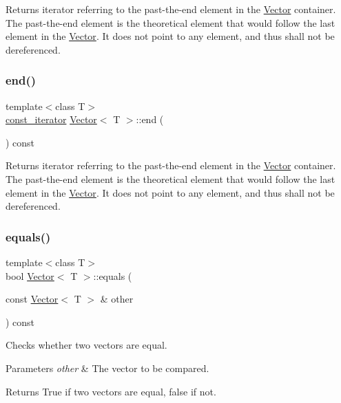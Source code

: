 Returns iterator referring to the {\ttfamily past-\/the-\/end} element in the \hyperlink{classVector}{Vector} container. The past-\/the-\/end element is the theoretical element that would follow the last element in the \hyperlink{classVector}{Vector}. It does not point to any element, and thus shall not be dereferenced. \mbox{\label{classVector_a3f5f39e8ec9f506664b259299e79c485}} 
\subsubsection{\texorpdfstring{end()}{end()}\hspace{0.1cm}{\footnotesize\ttfamily [4/4]}}
{\footnotesize\ttfamily template$<$class T$>$ \\
\hyperlink{classVector_a484e934cc06bb84c7d70042e792b6e55}{const\+\_\+iterator} \hyperlink{classVector}{Vector}$<$ T $>$\+::end (\begin{DoxyParamCaption}{ }\end{DoxyParamCaption}) const\hspace{0.3cm}{\ttfamily [inline]}}

Returns iterator referring to the {\ttfamily past-\/the-\/end} element in the \hyperlink{classVector}{Vector} container. The past-\/the-\/end element is the theoretical element that would follow the last element in the \hyperlink{classVector}{Vector}. It does not point to any element, and thus shall not be dereferenced. \mbox{\label{classVector_a3c4d1a9ee0630cf85060a79551e29144}} 
\subsubsection{\texorpdfstring{equals()}{equals()}\hspace{0.1cm}{\footnotesize\ttfamily [1/2]}}
{\footnotesize\ttfamily template$<$class T$>$ \\
bool \hyperlink{classVector}{Vector}$<$ T $>$\+::equals (\begin{DoxyParamCaption}\item[{const \hyperlink{classVector}{Vector}$<$ T $>$ \&}]{other }\end{DoxyParamCaption}) const\hspace{0.3cm}{\ttfamily [inline]}}

Checks whether two vectors are equal. 
\begin{DoxyParams}{Parameters}
{\em other} & The vector to be compared. \\
\hline
\end{DoxyParams}
\begin{DoxyReturn}{Returns}
True if two vectors are equal, false if not. 
\end{DoxyReturn}
\mbox{\label{classVector_a3c4d1a9ee0630cf85060a79551e29144}} 

